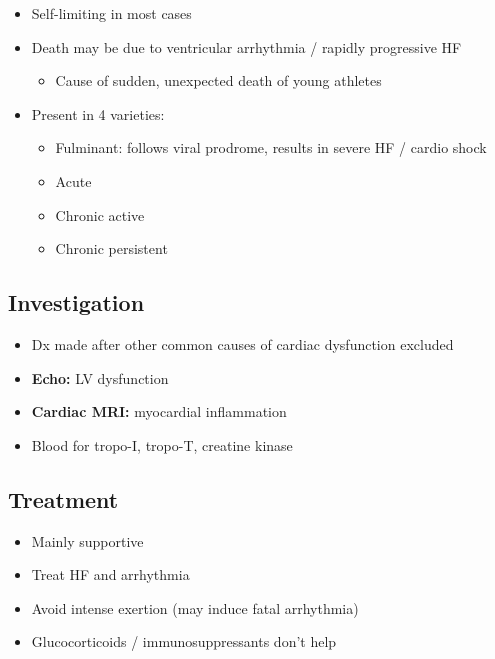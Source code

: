 \documentclass[
  12pt,
]{memoir}
\providecommand{\tightlist}{%
  \setlength{\itemsep}{0pt}\setlength{\parskip}{0pt}}
\begin{document}
\begin{itemize}
\tightlist
\item
  Self-limiting in most cases
\item
  Death may be due to ventricular arrhythmia / rapidly progressive HF

  \begin{itemize}
  \tightlist
  \item
    Cause of sudden, unexpected death of young athletes
  \end{itemize}
\item
  Present in 4 varieties:

  \begin{itemize}
  \tightlist
  \item
    Fulminant: follows viral prodrome, results in severe HF / cardio
    shock
  \item
    Acute
  \item
    Chronic active
  \item
    Chronic persistent
  \end{itemize}
\end{itemize}

\hypertarget{investigation-16}{%
\subsection{Investigation}\label{investigation-16}}

\begin{itemize}
\tightlist
\item
  Dx made after other common causes of cardiac dysfunction excluded
\item
  \textbf{Echo:} LV dysfunction
\item
  \textbf{Cardiac MRI:} myocardial inflammation
\item
  Blood for tropo-I, tropo-T, creatine kinase
\end{itemize}

\hypertarget{treatment-6}{%
\subsection{Treatment}\label{treatment-6}}

\begin{itemize}
\tightlist
\item
  Mainly supportive
\item
  Treat HF and arrhythmia
\item
  Avoid intense exertion (may induce fatal arrhythmia)
\item
  Glucocorticoids / immunosuppressants don't help
\end{itemize}
\end{document}
